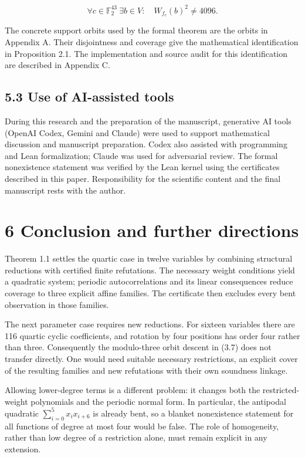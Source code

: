 \documentclass[11pt,a4paper]{article}
\begin{document}
\[
\forall c\in\mathbb F_2^{43}\ \exists b\in V:\quad W_{f_c}(b)^2\ne4096. \tag{5.1}
\]

The concrete support orbits used by the formal theorem are the orbits in Appendix A. Their disjointness and coverage give the mathematical identification in Proposition 2.1. The implementation and source audit for this identification are described in Appendix C.

\subsection*{5.3 Use of AI-assisted tools}

During this research and the preparation of the manuscript, generative AI tools (OpenAI Codex, Gemini and Claude) were used to support mathematical discussion and manuscript preparation. Codex also assisted with programming and Lean formalization; Claude was used for adversarial review. The formal nonexistence statement was verified by the Lean kernel using the certificates described in this paper. Responsibility for the scientific content and the final manuscript rests with the author.

\section*{6 Conclusion and further directions}

Theorem 1.1 settles the quartic case in twelve variables by combining structural reductions with certified finite refutations. The necessary weight conditions yield a quadratic system; periodic autocorrelations and its linear consequences reduce coverage to three explicit affine families. The certificate then excludes every bent observation in those families.

The next parameter case requires new reductions. For sixteen variables there are 116 quartic cyclic coefficients, and rotation by four positions has order four rather than three. Consequently the modulo-three orbit descent in (3.7) does not transfer directly. One would need suitable necessary restrictions, an explicit cover of the resulting families and new refutations with their own soundness linkage.

Allowing lower-degree terms is a different problem: it changes both the restricted-weight polynomials and the periodic normal form. In particular, the antipodal quadratic $\sum_{i=0}^{5}x_ix_{i+6}$ is already bent, so a blanket nonexistence statement for all functions of degree at most four would be false. The role of homogeneity, rather than low degree of a restriction alone, must remain explicit in any extension.
\end{document}
